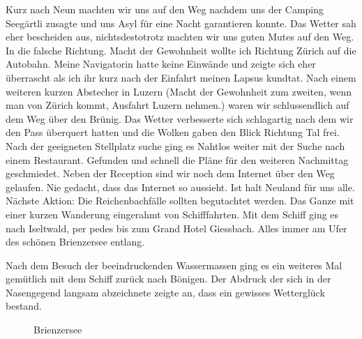 Kurz nach Neun machten wir uns auf den Weg nachdem uns der Camping Seegärtli zusagte und uns Asyl für eine Nacht garantieren konnte.
Das Wetter sah eher bescheiden aus, nichtsdestotrotz machten wir uns guten Mutes auf den Weg.
In die falsche Richtung.
Macht der Gewohnheit wollte ich Richtung Zürich auf die Autobahn.
Meine Navigatorin hatte keine Einwände und zeigte sich eher überrascht als ich ihr kurz nach der Einfahrt meinen Lapsus kundtat.
Nach einem weiteren kurzen Abstecher in Luzern (Macht der Gewohnheit zum zweiten, wenn man von Zürich kommt, Ausfahrt Luzern nehmen.)
waren wir schlussendlich auf dem Weg über den Brünig.
Das Wetter verbesserte sich schlagartig nach dem wir den Pass überquert hatten und die Wolken gaben den Blick Richtung Tal frei.
Nach der geeigneten Stellplatz suche ging es Nahtlos weiter mit der Suche nach einem Restaurant.
Gefunden und schnell die Pläne für den weiteren Nachmittag geschmiedet.
Neben der Reception sind wir noch dem Internet über den Weg gelaufen.
Nie gedacht, dass das Internet so aussieht.
Ist halt Neuland für uns alle.
Nächste Aktion: Die Reichenbachfälle sollten begutachtet werden.
Das Ganze mit einer kurzen Wanderung eingerahmt von Schifffahrten.
Mit dem Schiff ging es nach Iseltwald, per pedes bis zum Grand Hotel Giessbach.
Alles immer am Ufer des schönen Brienzersee entlang.

Nach dem Besuch der beeindruckenden Wassermassen ging es ein weiteres Mal gemütlich mit dem Schiff zurück nach Bönigen.
Der Abdruck der sich in der Nasengegend langsam abzeichnete zeigte an, dass ein gewisses Wetterglück bestand.

\begin{figure}[H]
   \centering
   \quad
   \quad
   \quad
   \caption[Brienzersee]{Brienzersee}
\end{figure}

